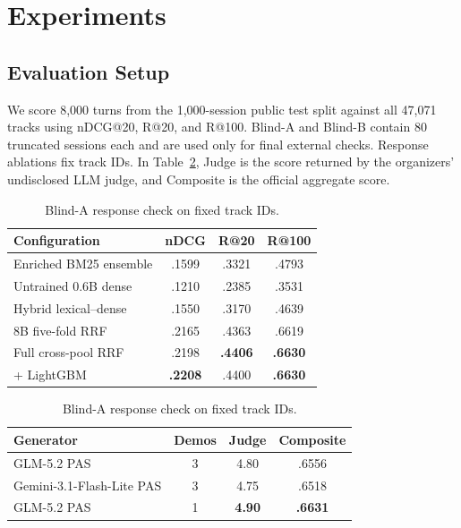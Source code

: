 \section{Experiments}
\label{sec:experiments}

\subsection{Evaluation Setup}

We score 8,000 turns from the 1,000-session public test split against all 47,071
tracks using nDCG@20, R@20, and R@100. Blind-A and Blind-B contain 80 truncated
sessions each and are used only for final external checks. Response ablations
fix track IDs. In Table~\ref{tab:response}, Judge is the score returned by the
organizers' undisclosed LLM judge, and Composite is the official aggregate
score.

\begin{table}[!t]
  \begin{minipage}[t]{0.49\textwidth}
    \caption{Public-test retrieval results; 0.6B is not task-adapted.}
    \label{tab:retrieval}
    \centering
    \scriptsize
    \setlength{\tabcolsep}{3pt}
    \begin{tabular}{@{}lccc@{}}
      \toprule
      Configuration & nDCG & R@20 & R@100 \\
      \midrule
      Enriched BM25 ensemble & .1599 & .3321 & .4793 \\
      Untrained 0.6B dense & .1210 & .2385 & .3531 \\
      Hybrid lexical--dense & .1550 & .3170 & .4639 \\
      8B five-fold RRF & .2165 & .4363 & .6619 \\
      Full cross-pool RRF & .2198 & \textbf{.4406} & \textbf{.6630} \\
      + LightGBM & \textbf{.2208} & .4400 & \textbf{.6630} \\
      \bottomrule
    \end{tabular}
  \end{minipage}\hfill
  \begin{minipage}[t]{0.47\textwidth}
    \caption{Blind-A response check on fixed track IDs.}
    \label{tab:response}
    \centering
    \scriptsize
    \setlength{\tabcolsep}{3pt}
    \begin{tabular}{@{}lccc@{}}
      \toprule
      Generator & Demos & Judge & Composite \\
      \midrule
      GLM-5.2 PAS & 3 & 4.80 & .6556 \\
      Gemini-3.1-Flash-Lite PAS & 3 & 4.75 & .6518 \\
      GLM-5.2 PAS & 1 & \textbf{4.90} & \textbf{.6631} \\
      \bottomrule
    \end{tabular}
  \end{minipage}
  \vspace{-5mm}
\end{table}

